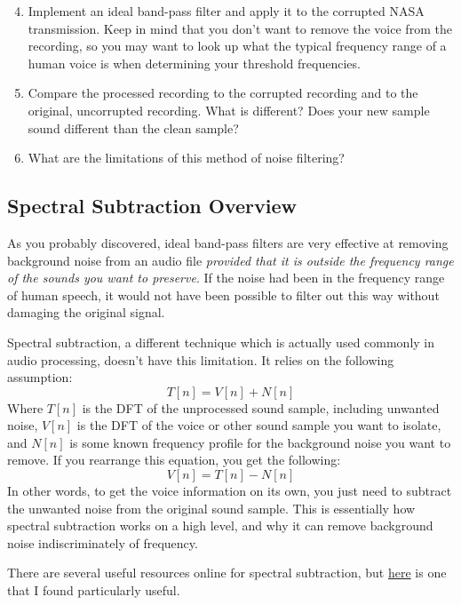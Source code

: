 \documentclass{tufte-handout}
\begin{document}
\begin{enumerate}
	\setcounter{enumi}{3}
	\item Implement an ideal band-pass filter and apply it to the corrupted NASA transmission. Keep in mind that you don’t want to remove the voice from the recording, so you may want to look up what the typical frequency range of a human voice is when determining your threshold frequencies.
	\item Compare the processed recording to the corrupted recording and to the original, uncorrupted recording. What is different? Does your new sample sound different than the clean sample?
	\item What are the limitations of this method of noise filtering?
\end{enumerate}

\subsection{Spectral Subtraction Overview}
As you probably discovered, ideal band-pass filters are very effective at removing background noise from an audio file \textit{provided that it is outside the frequency range of the sounds you want to preserve}. If the noise had been in the frequency range of human speech, it would not have been possible to filter out this way without damaging the original signal.

Spectral subtraction, a different technique which is actually used commonly in audio processing, doesn’t have this limitation. It relies on the following assumption:
\begin{equation}
	T[n] = V[n] + N[n]
\end{equation}
Where $T[n]$  is the DFT of the unprocessed sound sample, including unwanted noise, $V[n]$ is the DFT of the voice or other sound sample you want to isolate, and $N[n]$ is some known frequency profile for the background noise you want to remove. If you rearrange this equation, you get the following:
\begin{equation}
	V[n] = T[n] - N[n]
\end{equation}
In other words, to get the voice information on its own, you just need to subtract the unwanted noise from the original sound sample. This is essentially how spectral subtraction works on a high level, and why it can remove background noise indiscriminately of frequency.

There are several useful resources online for spectral subtraction, but \href{http://practicalcryptography.com/miscellaneous/machine-learning/tutorial-spectral-subraction/}{here} is one that I found particularly useful.
\end{document}
